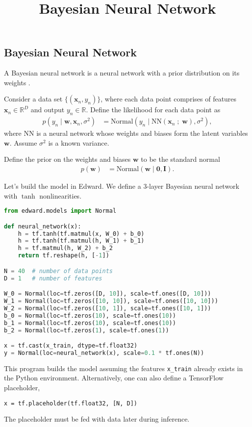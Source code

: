 \title{Bayesian Neural Network}

\subsection{Bayesian Neural Network}

A Bayesian neural network is a neural network with a prior
distribution on its weights \citep{neal2012bayesian}.

Consider a data set $\{(\mathbf{x}_n, y_n)\}$, where each data point
comprises of features $\mathbf{x}_n\in\mathbb{R}^D$ and output
$y_n\in\mathbb{R}$. Define the likelihood for each data point as
\begin{align*}
  p(y_n \mid \mathbf{w}, \mathbf{x}_n, \sigma^2)
  &=
  \text{Normal}(y_n \mid \mathrm{NN}(\mathbf{x}_n\;;\;\mathbf{w}), \sigma^2),
\end{align*}
where $\mathrm{NN}$ is a neural network whose weights and biases form
the latent variables $\mathbf{w}$. Assume $\sigma^2$ is a
known variance.

Define the prior on the weights and biases $\mathbf{w}$ to be the standard normal
\begin{align*}
  p(\mathbf{w})
  &=
  \text{Normal}(\mathbf{w} \mid \mathbf{0}, \mathbf{I}).
\end{align*}

Let's build the model in Edward. We define a 3-layer Bayesian neural
network with $\tanh$ nonlinearities.
\begin{lstlisting}[language=Python]
from edward.models import Normal

def neural_network(x):
    h = tf.tanh(tf.matmul(x, W_0) + b_0)
    h = tf.tanh(tf.matmul(h, W_1) + b_1)
    h = tf.matmul(h, W_2) + b_2
    return tf.reshape(h, [-1])

N = 40  # number of data points
D = 1   # number of features

W_0 = Normal(loc=tf.zeros([D, 10]), scale=tf.ones([D, 10]))
W_1 = Normal(loc=tf.zeros([10, 10]), scale=tf.ones([10, 10]))
W_2 = Normal(loc=tf.zeros([10, 1]), scale=tf.ones([10, 1]))
b_0 = Normal(loc=tf.zeros(10), scale=tf.ones(10))
b_1 = Normal(loc=tf.zeros(10), scale=tf.ones(10))
b_2 = Normal(loc=tf.zeros(1), scale=tf.ones(1))

x = tf.cast(x_train, dtype=tf.float32)
y = Normal(loc=neural_network(x), scale=0.1 * tf.ones(N))
\end{lstlisting}
This program builds the model assuming the features \texttt{x\_train}
already exists in the Python environment. Alternatively, one can also
define a TensorFlow placeholder,
\begin{lstlisting}
x = tf.placeholder(tf.float32, [N, D])
\end{lstlisting}
The placeholder must be fed with data later during inference.

